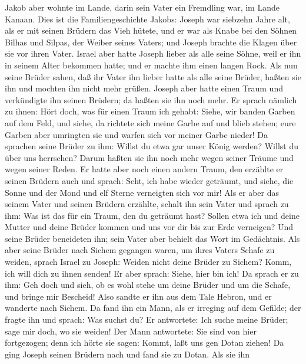  Jakob aber wohnte im Lande, darin sein Vater ein
Fremdling war, im Lande Kanaan.  Dies ist die
Familiengeschichte Jakobs: Joseph war siebzehn Jahre alt, als er mit
seinen Brüdern das Vieh hütete, und er war als Knabe bei den Söhnen
Bilhas und Silpas, der Weiber seines Vaters; und Joseph brachte die
Klagen über sie vor ihren Vater.  Israel aber hatte Joseph
lieber als alle seine Söhne, weil er ihn in seinem Alter bekommen hatte;
und er machte ihm einen langen Rock.  Als nun seine Brüder
sahen, daß ihr Vater ihn lieber hatte als alle seine Brüder, haßten sie
ihn und mochten ihn nicht mehr grüßen.  Joseph aber hatte
einen Traum und verkündigte ihn seinen Brüdern; da haßten sie ihn noch
mehr.  Er sprach nämlich zu ihnen: Hört doch, was für
einen Traum ich gehabt:  Siehe, wir banden Garben auf dem
Feld, und siehe, da richtete sich meine Garbe auf und blieb stehen; eure
Garben aber umringten sie und warfen sich vor meiner Garbe nieder!
 Da sprachen seine Brüder zu ihm: Willst du etwa gar unser
König werden? Willst du über uns herrschen? Darum haßten sie ihn noch
mehr wegen seiner Träume und wegen seiner Reden.  Er hatte
aber noch einen andern Traum, den erzählte er seinen Brüdern auch und
sprach: Seht, ich habe wieder geträumt, und siehe, die Sonne und der
Mond und elf Sterne verneigten sich vor mir!  Als er aber
das seinem Vater und seinen Brüdern erzählte, schalt ihn sein Vater und
sprach zu ihm: Was ist das für ein Traum, den du geträumt hast? Sollen
etwa ich und deine Mutter und deine Brüder kommen und uns vor dir bis
zur Erde verneigen?  Und seine Brüder beneideten ihn;
sein Vater aber behielt das Wort im Gedächtnis.  Als aber
seine Brüder nach Sichem gegangen waren, um ihres Vaters Schafe zu
weiden,  sprach Israel zu Joseph: Weiden nicht deine
Brüder zu Sichem? Komm, ich will dich zu ihnen senden! Er aber sprach:
Siehe, hier bin ich!  Da sprach er zu ihm: Geh doch und
sieh, ob es wohl stehe um deine Brüder und um die Schafe, und bringe mir
Bescheid! Also sandte er ihn aus dem Tale Hebron, und er wanderte nach
Sichem.  Da fand ihn ein Mann, als er irreging auf dem
Gefilde; der fragte ihn und sprach: Was suchst du?  Er
antwortete: Ich suche meine Brüder; sage mir doch, wo sie weiden!
 Der Mann antwortete: Sie sind von hier fortgezogen; denn
ich hörte sie sagen: Kommt, laßt uns gen Dotan ziehen! Da ging Joseph
seinen Brüdern nach und fand sie zu Dotan.  Als sie ihn
